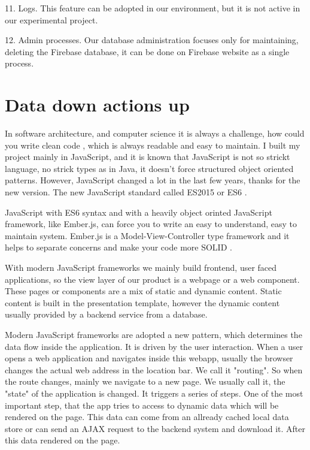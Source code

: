 \documentclass[12pt, a4paper, oneside, openright, medskipamount]{report}
\begin{document}
11. Logs. This feature can be adopted in our environment, but it is not active in our experimental project.

12. Admin processes. Our database administration focuses only for maintaining, deleting the Firebase database, it can be done on Firebase website as a single process.

\section{Data down actions up}

In software architecture, and computer science it is always a challenge, how could you write clean code \cite{clean-code}, which is always readable and easy to maintain. I built my project mainly in JavaScript, and it is known that JavaScript is not so strickt language, no strick types as in Java, it doesn't force structured object oriented patterns. However, JavaScript changed a lot in the last few years, thanks for the new version. The new JavaScript standard called ES2015 or ES6 \cite{es6}.

JavaScript with ES6 syntax and with a heavily object orinted JavaScript framework, like Ember.js, can force you to write an easy to understand, easy to maintain system. Ember.js is a Model-View-Controller type framework and it helps to separate concerns and make your code more SOLID \cite{solid}.

With modern JavaScript frameworks we mainly build frontend, user faced applications, so the view layer of our product is a webpage or a web component. These pages or components are a mix of static and dynamic content. Static content is built in the presentation template, however the dynamic content usually provided by a backend service from a database.

Modern JavaScript frameworks are adopted a new pattern, which determines the data flow inside the application. It is driven by the user interaction. When a user opens a web application and navigates inside this webapp, usually the browser changes the actual web address in the location bar. We call it "routing". So when the route changes, mainly we navigate to a new page. We usually call it, the "state" of the application is changed. It triggers a series of steps. One of the most important step, that the app tries to access to dynamic data which will be rendered on the page. This data can come from an allready cached local data store or can send an AJAX request to the backend system and download it. After this data rendered on the page.
\end{document}
